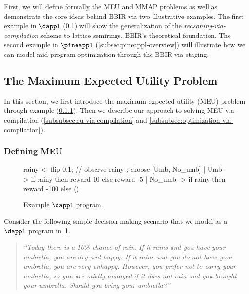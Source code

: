 First, we will define formally the MEU and MMAP problems
as well as demonstrate the core ideas behind BBIR via two illustrative examples.
The first example in $\dappl$ (\cref{subsec:dappl-overview}) will show
the generalization of the \textit{reasoning-via-compilation} scheme
to lattice semirings, BBIR's theoretical foundation.
The second example in $\pineappl$ (\cref{subsec:pineappl-overview}) will illustrate
how we can model mid-program optimization through the BBIR via staging.

\subsection{The Maximum Expected Utility Problem}\label{subsec:dappl-overview}
In this section, we first introduce the maximum expected utility (MEU) problem
through example (\cref{subsubsec:meu-example}). Then we describe our
approach to solving MEU via compilation (\cref{subsubsec:eu-via-compilation}
and \cref{subsubsec:optimization-via-compilation}).

\subsubsection{Defining MEU}\label{subsubsec:meu-example}

\begin{wrapfigure}{r}{0.3\linewidth}
  \begin{dapplcodeblock}[basicstyle=\tiny\ttfamily]
rainy <- flip 0.1;
// observe rainy ;
choose [Umb, No_umb]
| Umb -> if rainy then
    reward 10 else reward -5
| No_umb -> if rainy then
    reward -100 else ()
\end{dapplcodeblock}
\caption{Example $\dappl$ program.}
\label{fig:motivation-dappl}
\end{wrapfigure}
Consider the following simple decision-making scenario that we model as a $\dappl$ program
in~\cref{fig:motivation-dappl}.

\begin{quote}
\textit{``Today there is a 10\% chance of rain.
  If it rains and you have your umbrella, you are dry and happy.
  If it rains and you do not have your
  umbrella, you are very unhappy. However, you prefer not to carry your umbrella,
  so you are mildly annoyed if it does not rain and you brought your umbrella.
  Should you bring your umbrella?''}
\end{quote}

